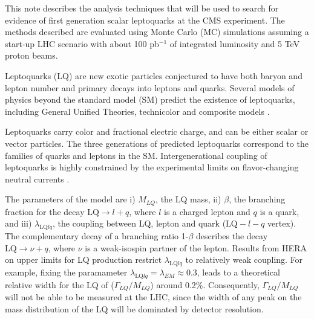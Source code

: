 This note describes the analysis techniques that will be used to search for evidence of first generation scalar leptoquarks 
at the CMS experiment. The methods described are evaluated using Monte Carlo (MC) simulations assuming a start-up LHC scenario
with about 100 pb$^{-1}$ of integrated luminosity and 5 TeV proton beams.

Leptoquarks (LQ) are new exotic particles conjectured to have both baryon and lepton number and primary decays into leptons and quarks.    
Several models of physics beyond the standard model (SM) predict the existence of leptoquarks, including General Unified Theories, 
technicolor and composite models \cite{theories}.  

Leptoquarks carry color and fractional electric 
charge, and can be either scalar or vector particles. The three generations of predicted leptoquarks 
correspond to the families of quarks and leptons in the SM.  Intergenerational coupling of leptoquarks is 
highly constrained by the experimental limits on flavor-changing neutral currents \cite{ADDREFERENCE}. 

The parameters of the model are i) $M_{LQ}$, the LQ mass, ii) $\beta$, the branching fraction for the decay 
$\mbox{LQ} \rightarrow l + q$, where $l$ is a charged lepton and $q$ is a quark, and
iii) $\lambda_{\mbox{LQ}lq}$, the coupling between LQ, lepton and quark ($\mbox{LQ}-l-q$ vertex). 
The complementary decay of a branching ratio 1-$\beta$ describes the decay $\mbox{LQ} \rightarrow \nu + q$, 
where $\nu$ is a weak-isospin partner of the lepton.
Results from HERA on upper limits for LQ production restrict  
$\lambda_{\mbox{LQ}lq}$ to relatively weak coupling\cite{hera}. For example, fixing the paramameter 
$\lambda_{\mbox{LQ}lq} = \lambda_{EM} \approx 0.3$, leads to 
a theoretical relative width for the LQ of ($\Gamma_{LQ}/M_{LQ}$) around 0.2\%. 
Consequently, $\Gamma_{LQ}/M_{LQ}$ will not be able to be measured at the LHC, since 
the width of any peak on the mass distribution of the LQ will be dominated by detector resolution.  

